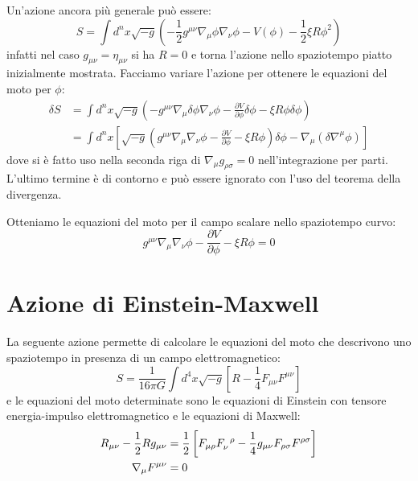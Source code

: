 Un'azione ancora più generale può essere:
\begin{equation*}
    S = \int d^n x \sqrt{-g}\left( - \frac{1}{2}g^{\mu\nu} \nabla_\mu \phi \nabla_\nu \phi - V(\phi) - \frac{1}{2}\xi R\phi^2\right)
\end{equation*}
infatti nel caso $g_{\mu\nu} = \eta_{\mu\nu}$ si ha $R= 0 $ e torna l'azione nello spaziotempo piatto inizialmente mostrata.
Facciamo variare l'azione per ottenere le equazioni del moto per $\phi$:
\begin{align*}
    \delta S &=  \int d^n x \sqrt{-g} \left( - g^{\mu\nu} \nabla_\mu \delta\phi \nabla_\nu \phi - \frac{\partial V}{\partial \phi }\delta \phi - \xi R\phi\delta\phi\right) \\
    &= \int d^n x \left[ \sqrt{-g} \left( g^{\mu\nu} \nabla_\mu\nabla_\nu \phi - \frac{\partial V}{\partial \phi} - \xi R\phi\right)\delta\phi - \nabla_\mu(\delta \nabla^\mu \phi)  \right] 
\end{align*}
dove si è fatto uso nella seconda riga di $\nabla_\mu g_{\rho\sigma} = 0$ nell'integrazione per parti. L'ultimo termine è di contorno e può essere ignorato con l'uso del teorema della divergenza.

Otteniamo le equazioni del moto per il campo scalare nello spaziotempo curvo:
\begin{equation*}
    g^{\mu\nu} \nabla_\mu \nabla_\nu \phi - \frac{\partial V}{\partial \phi } - \xi R\phi = 0
\end{equation*}

\section{Azione di Einstein-Maxwell}
La seguente azione permette di calcolare le equazioni del moto che descrivono uno spaziotempo in presenza di un campo elettromagnetico:
\begin{equation}
S =  \frac{1}{16\pi G}\int d^4 x \sqrt{-g}\left[ R - \frac{1}{4}F_{\mu\nu}F^{\mu\nu}\right]
 \label{eq.azione_einstein_maxwell}
\end{equation}
e le equazioni del moto determinate sono le equazioni di Einstein con tensore energia-impulso elettromagnetico e le equazioni di Maxwell:
\begin{align}
R_{\mu\nu} - \frac{1}{2}Rg_{\mu\nu} &=\frac{1}{2}\left[F_{\mu\rho}\tensor{F}{_\nu^\rho} - \frac{1}{4}g_{\mu\nu}F_{\rho\sigma}F^{\rho\sigma} \right] \\
\nabla_\mu F^{\mu\nu} &= 0
    \label{eq.equazioni_einstein_maxwell}
\end{align}

